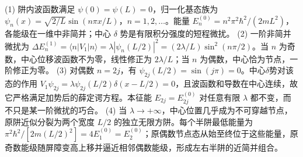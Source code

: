 (1) 阱内波函数满足 \(\psi(0)=\psi(L)=0\)，归一化基态族为 \(\psi_n(x)=\sqrt{2/L}\sin(n\pi x/L)\)，\(n=1,2,\ldots\)。能量 \(E_n^{(0)}=n^2\pi^2\hbar^2/(2mL^2)\)，各能级在一维中非简并；中心 \(\delta\) 势是有限积分强度的短程微扰。
(2) 一阶非简并微扰为 \(\Delta E_n^{(1)}=\langle n|V_1|n\rangle=\lambda|\psi_n(L/2)|^2=(2\lambda/L)\sin^2(n\pi/2)\)。当 \(n\) 为奇数，中心位移波函数不为零，线性修正为 \(2\lambda/L\)；当 \(n\) 为偶数，中心恰为节点，一阶修正为零。
(3) 对偶数 \(n=2j\)，有 \(\psi_{2j}(L/2)=\sin(j\pi)=0\)。中心\(\delta \)势对该态的作用 \(V_1\psi_{2j}=\lambda\psi_{2j}(L/2)\delta(x-L/2)=0\)，且波函数和导数在中心连续，故它严格满足加势后的薛定谔方程。本征能 \(E_{2j}=E_{2j}^{(0)}\) 对任意有限 \(\lambda\) 都不变，而不只是某一阶微扰的巧合。
(4) 当 \(\lambda\to+\infty\)，中心位置几乎成为不可穿越节点，原阱近似分裂为两个宽度 \(L/2\) 的独立无限方阱。每个半阱最低能量为 \(\pi^2\hbar^2/[2m(L/2)^2]=4E_1^{(0)}=E_2^{(0)}\)；原偶数节点态从始至终位于这些能量，原奇数能级随屏障变高上移并逼近相邻偶数能级，形成左右半阱的近简并组合。
